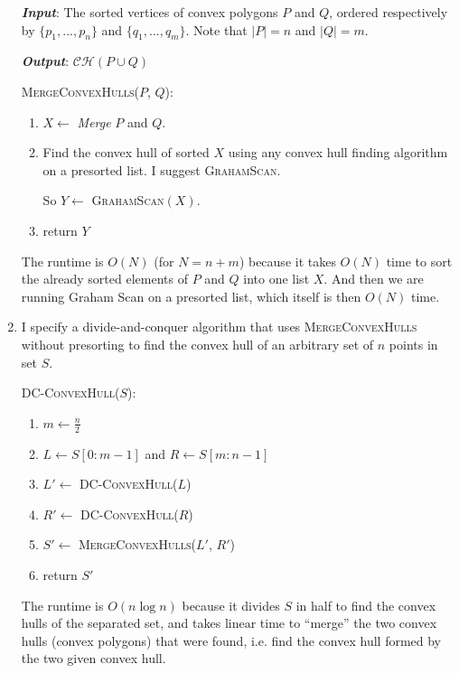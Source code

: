 \documentclass [12pt]{article}
\begin{document}
\begin{enumerate}[label=(\alph*)]
        \emph{\textbf{Input}}: The sorted vertices of convex polygons $P$ and $Q$, ordered respectively by $\{ p_1, ..., p_{n}\}$ and $\{ q_1, ..., q_{m}\}$. Note that $|P| = n$ and $|Q| = m$.

        \emph{\textbf{Output}}: $\mathcal{CH}(P \cup Q)$

        
            \cbstart
            \textsc{MergeConvexHulls($P$, $Q$)}:
            \begin{enumerate}[label=\arabic*.]
                \item $X \leftarrow$ \emph{Merge} $P$ and $Q$.
                \item Find the convex hull of sorted $X$ using any convex hull finding algorithm on a presorted list. I suggest \textsc{GrahamScan}. 
                
                So $Y \leftarrow$ \textsc{GrahamScan}$(X)$.

                \item return $Y$
            \end{enumerate}
        \cbend


        The runtime is $O(N)$ (for $N = n + m$) because it takes $O(N)$ time to sort the already sorted elements of $P$ and $Q$ into one list $X$. And then we are running Graham Scan on a presorted list, which itself is then $O(N)$ time.
        
        \item I specify a divide-and-conquer algorithm that uses \textsc{MergeConvexHulls} without presorting to find the convex hull of an arbitrary set of $n$ points in set $S$.
        
            \cbstart
            \textsc{DC-ConvexHull($S$)}:
            \begin{enumerate}[label=\arabic*.]
                \item $m \leftarrow \frac{n}{2}$
                \item $L \leftarrow S[0:m-1]$ and $R \leftarrow S[m:n-1]$
                \item $L' \leftarrow$ \textsc{DC-ConvexHull($L$)}
                \item $R' \leftarrow$ \textsc{DC-ConvexHull($R$)}
                \item $S' \leftarrow$ \textsc{MergeConvexHulls($L'$, $R'$)}
                \item return $S'$
            \end{enumerate}
        \cbend

        The runtime is $O(n \log n)$ because it divides $S$ in half to find the convex hulls of the separated set, and takes linear time to ``merge'' the two convex hulls (convex polygons) that were found, i.e. find the convex hull formed by the two given convex hull.

    \end{enumerate}
\end{document}
